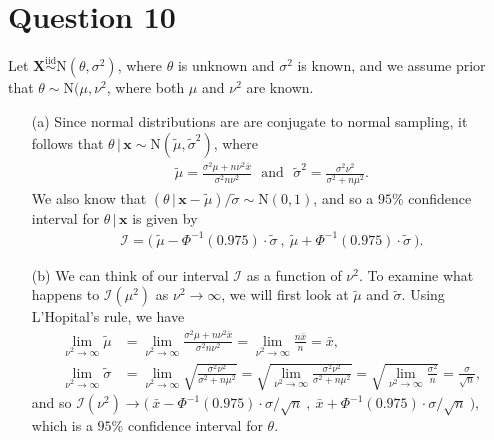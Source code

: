 \documentclass[10pt]{article}
\begin{document}
\section{Question 10} \noindent
Let \(\bm{X} \overset{\mathrm{iid}}{\sim} \mathrm{N}(\theta, \sigma^2)\), where \(\theta\) is unknown and \(\sigma^2\) is known, and we assume prior that 
\(\theta \sim \mathrm{N}(\mu, \nu^2\), where both \(\mu\) and \(\nu^2\) are known. 
\begin{itemize}
    \item[(a)] Since normal distributions are are conjugate to normal sampling, it follows
    that \(\theta \,|\, \mathbf{x} \sim \mathrm{N}(\tilde{\mu}, \tilde{\sigma}^2)\), where 
    \begin{align*}
        \tilde{\mu}
        = \frac{\sigma^2 \mu + n \nu^2 \bar{x}}{\sigma^2 n \nu^2}
        ~~~\text{and}~~~
        \tilde{\sigma}^2
        = \frac{\sigma^2 \nu^2}{\sigma^2 + n \mu^2}.
    \end{align*}
    We also know that \((\theta \,|\, \mathbf{x} - \tilde{\mu}) / \tilde{\sigma} \sim \mathrm{N}(0,1)\), and so a \(95\)\%{} confidence interval for 
    \(\theta \,|\, \mathbf{x}\) is given by 
    \begin{align*}
        \mathcal{I}
        = \Big( ~ \tilde{\mu} - \Phi^{-1}(0.975) \cdot \tilde{\sigma} ~,~ \tilde{\mu} + \Phi^{-1}(0.975) \cdot \tilde{\sigma} ~ \Big).
    \end{align*} 
    \item[(b)] We can think of our interval \(\mathcal{I}\) as a function of \(\nu^2\). To examine what happens to \(\mathcal{I}(\mu^2)\) as \(\nu^2 \to \infty\), we 
    will first look at \(\tilde{\mu}\) and \(\tilde{\sigma}\). Using L'Hopital's rule, we have
    \begin{align*}
        \lim_{\nu^2 \to \infty} \tilde{\mu}
        &= \lim_{\nu^2 \to \infty} \frac{\sigma^2 \mu + n \nu^2 \bar{x}}{\sigma^2 n \nu^2}
        = \lim_{\nu^2 \to \infty} \frac{n \bar{x}}{n}
        = \bar{x}, \\
        \lim_{\nu^2 \to \infty} \tilde{\sigma}
        &= \lim_{\nu^2 \to \infty} \sqrt{\frac{\sigma^2 \nu^2}{\sigma^2 + n \mu^2}}
        = \sqrt{ \lim_{\nu^2 \to \infty} \frac{\sigma^2 \nu^2}{\sigma^2 + n \mu^2}}
        = \sqrt{ \lim_{\nu^2 \to \infty} \frac{\sigma^2}{n}}
        = \frac{\sigma}{\sqrt{n}},
    \end{align*}
    and so \(\mathcal{I}(\nu^2) \to \big( ~\bar{x} - \Phi^{-1}(0.975) \cdot \sigma / \sqrt{n} ~,~ \bar{x} + \Phi^{-1}(0.975) \cdot \sigma / \sqrt{n} ~ \big)\),
    which is a \(95\)\%{} confidence interval for \(\theta\). 
\end{itemize}
\end{document}
